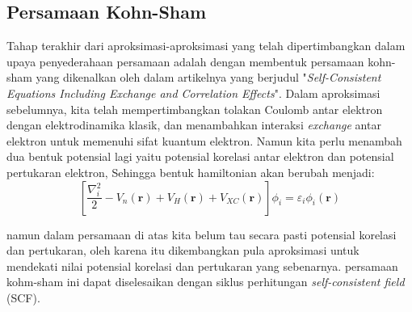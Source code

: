 \subsection{Persamaan Kohn-Sham}
Tahap terakhir dari aproksimasi-aproksimasi yang telah dipertimbangkan dalam upaya penyederahaan persamaan \schro adalah dengan membentuk persamaan kohn-sham yang dikenalkan oleh \citeauthor{kohnsham} dalam artikelnya yang berjudul "\textit{Self-Consistent Equations Including Exchange and Correlation Effects}". Dalam aproksimasi sebelumnya, kita telah mempertimbangkan tolakan Coulomb antar elektron dengan elektrodinamika klasik, dan menambahkan interaksi \textit{exchange} antar elektron untuk memenuhi sifat kuantum elektron. Namun kita perlu menambah dua bentuk potensial lagi yaitu potensial korelasi antar elektron dan potensial pertukaran elektron, Sehingga bentuk hamiltonian akan berubah menjadi:
\begin{equation}
\left [\dfrac{\nabla^2_i}{2}-V_n(\mathbf{r})+V_H(\mathbf{r})+V_{XC}(\mathbf{r})  \right]\phi_i=\varepsilon_i\phi_i(\mathbf{r})
\end{equation}

namun dalam persamaan di atas kita belum tau secara pasti potensial korelasi dan pertukaran, oleh karena itu dikembangkan pula aproksimasi untuk mendekati nilai potensial korelasi dan pertukaran yang sebenarnya. persamaan kohm-sham ini dapat diselesaikan dengan siklus perhitungan \textit{self-consistent field} (SCF). 

